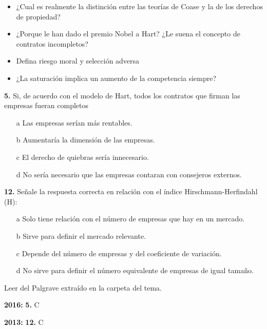 \documentclass{nuevotema}
\begin{document}
\conceptos


\preguntas


\begin{itemize}
	\item ¿Cual es realmente la distinción entre las teorías de Coase y la de los derechos de propiedad? 
	\item ¿Porque le han dado el premio Nobel a Hart? ¿Le suena el concepto de contratos incompletos?
	\item Defina riesgo moral y selección adversa
	\item ¿La saturación implica un aumento de la competencia siempre?
\end{itemize}

\textbf{5.} Si, de acuerdo con el modelo de Hart, todos los contratos que firman las empresas fueran completos

\begin{itemize}
	\item[a] Las empresas serían más rentables.
	\item[b] Aumentaría la dimensión de las empresas.
	\item[c] El derecho de quiebras sería innecesario.
	\item[d] No sería necesario que las empresas contaran con consejeros externos.
\end{itemize}

\textbf{12.} Señale la respuesta correcta en relación con el índice Hirschmann-Herfindahl (H):
\begin{itemize}
	\item[a] Solo tiene relación con el número de empresas que hay en un mercado.
	\item[b] Sirve para definir el mercado relevante.
	\item[c] Depende del número de empresas y del coeficiente de variación.
	\item[d] No sirve para definir el número equivalente de empresas de igual tamaño.
\end{itemize}

\notas

Leer  del Palgrave extraído en la carpeta del tema.

\textbf{2016:} \textbf{5.} C

\textbf{2013:} \textbf{12.} C
\end{document}
